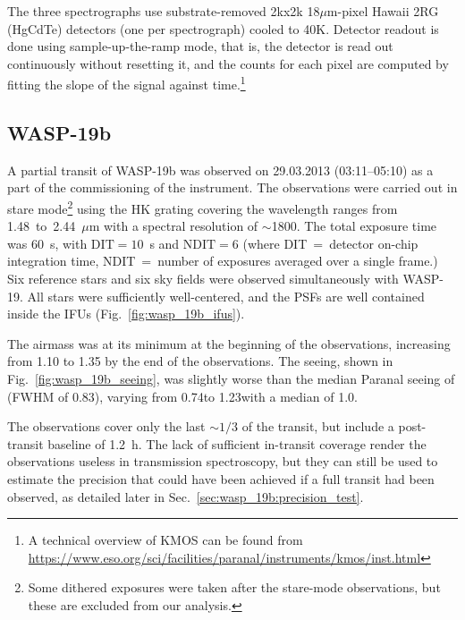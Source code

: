 \documentclass[useAMS,usenatbib]{mn2e}
\begin{document}
The three spectrographs use substrate-removed 2kx2k 18$\mu$m-pixel Hawaii 2RG (HgCdTe) detectors (one per spectrograph)
cooled to 40K. Detector readout is done using sample-up-the-ramp mode, that is, the detector is read out continuously
without resetting it, and the counts for each pixel are computed by fitting the slope of the signal against
time.$\!$\footnote{A technical overview of KMOS can be found from
\url{https://www.eso.org/sci/facilities/paranal/instruments/kmos/inst.html}}

\subsection{WASP-19b}
\label{sec:observations:wasp-19b}

A partial transit of WASP-19b \citep[H=10.6][]{Hebb2010} was observed on 29.03.2013 (03:11--05:10) as a part of the 
commissioning of the 
instrument. The observations were carried out in stare mode\footnote{Some dithered exposures were taken after the 
stare-mode observations, but these are excluded from our analysis.} using the HK grating  covering the wavelength 
ranges from 1.48~to~2.44~$\mu$m with a spectral resolution of $\sim$1800. The total exposure time was 60~s, with  
$\mathrm{DIT}=10$~s and $\mathrm{NDIT}=6$ (where DIT~=~detector on-chip integration time, NDIT~=~number of exposures
averaged over a single frame.) Six reference stars and six sky fields were observed simultaneously with 
WASP-19. All stars were sufficiently well-centered, and the PSFs are well contained inside the IFUs 
(Fig.~\ref{fig:wasp_19b_ifus}).

The airmass was at its minimum at the beginning of the observations, increasing from 1.10 to 1.35 by the end of the 
observations. The seeing, shown in Fig.~\ref{fig:wasp_19b_seeing}, was slightly worse than the median Paranal seeing of 
(FWHM of 0.83\arcsec), varying from 0.74\arcsec to 1.23\arcsec with a median of 1.0\arcsec.

The observations cover only the last $\sim1/3$ of the transit, but include a post-transit baseline of 1.2~h. The lack 
of sufficient in-transit coverage render the observations useless in transmission spectroscopy, but they can still be 
used to estimate the precision that could have been achieved if a full transit had been observed, as detailed later in 
Sec.~\ref{sec:wasp_19b:precision_test}. 
\end{document}
